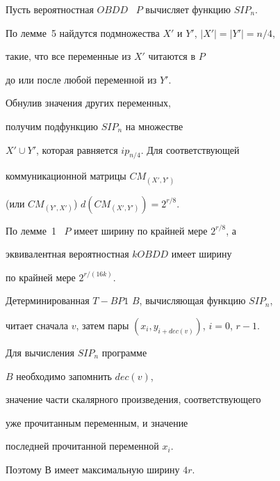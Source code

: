 \begin{pf}


Пусть вероятностная $OBDD$ \ $P$ вычисляет функцию $SIP_n$.


По лемме~5 найдутся подмножества $X'$ и $Y'$, $|X'|=|Y'|=n/4$,


такие, что все переменные из $X'$ читаются в $P$


до или после любой переменной из $Y'$.


Обнулив значения других переменных,


получим подфункцию $SIP_n$ на множестве


$X'\cup Y'$, которая равняется $ip_{n/4}$. Для соответствующей 


коммуникационной матрицы $CM_{(X',Y')}$


(или $CM_{(Y',X')}$) $d(CM_{(X',Y')})=2^{r/8}$.


По лемме~1 \ $P$ имеет ширину по крайней мере $2^{r/8}$, а


эквивалентная вероятностная $kOBDD$ имеет ширину


по крайней мере $2^{r/(16k)}$.





Детерминированная $T{-}BP1$ $B$, вычисляющая функцию $SIP_n$,


читает сначала $v$, затем пары $(x_i,y_{i+dec(v)})$, $i=0$, $r-1$.


Для вычисления $SIP_n$ программе


$B$ необходимо запомнить $dec(v)$,


значение части скалярного произведения, соответствующего


уже прочитанным переменным, и значение


последней прочитанной переменной $x_i$.


Поэтому В имеет максимальную ширину $4r$.


\end{pf}








